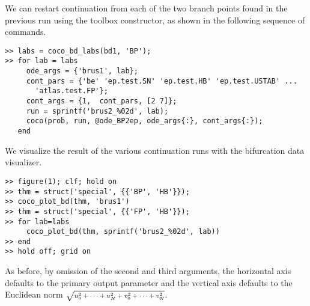 We can restart continuation from each of the two branch points found in the previous run using the  toolbox constructor, as shown in the following sequence of commands.
\begin{lstlisting}[language=coco-highlight]
>> labs = coco_bd_labs(bd1, 'BP');
>> for lab = labs
     ode_args = {'brus1', lab};
     cont_pars = {'be' 'ep.test.SN' 'ep.test.HB' 'ep.test.USTAB' ...
       'atlas.test.FP'};
     cont_args = {1,  cont_pars, [2 7]};
     run = sprintf('brus2_%02d', lab);
     coco(prob, run, @ode_BP2ep, ode_args{:}, cont_args{:});
   end
\end{lstlisting}
We visualize the result of the various continuation runs with the  bifurcation data visualizer.
\begin{lstlisting}[language=coco-highlight]
>> figure(1); clf; hold on
>> thm = struct('special', {{'BP', 'HB'}});
>> coco_plot_bd(thm, 'brus1')
>> thm = struct('special', {{'FP', 'HB'}});
>> for lab=labs
     coco_plot_bd(thm, sprintf('brus2_%02d', lab))
>> end
>> hold off; grid on
\end{lstlisting}
As before, by omission of the second and third arguments, the horizontal axis defaults to the primary output parameter  and the vertical axis defaults to the Euclidean norm $\mbox{\scriptsize$\sqrt{u_0^2+\cdots+u_N^2+v_0^2+\cdots+v_N^2}$}$.

